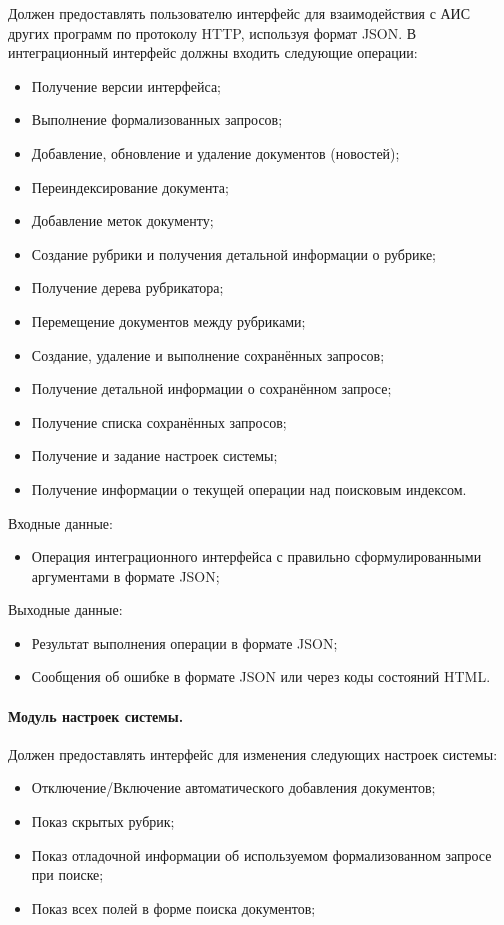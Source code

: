 Должен предоставлять пользователю интерфейс для взаимодействия с АИС других программ по протоколу HTTP, используя формат JSON. В интеграционный интерфейс должны входить следующие операции:
\begin{itemize}
\item Получение версии интерфейса;
\item Выполнение формализованных запросов;
\item Добавление, обновление и удаление документов (новостей);
\item Переиндексирование документа;
\item Добавление меток документу;
\item Создание рубрики и получения детальной информации о рубрике;
\item Получение дерева рубрикатора;
\item Перемещение документов между рубриками;
\item Создание, удаление и выполнение сохранённых запросов;
\item Получение детальной информации о сохранённом запросе;
\item Получение списка сохранённых запросов;
\item Получение и задание настроек системы;
\item Получение информации о текущей операции над поисковым индексом.
\end{itemize}

Входные данные:
\begin{itemize}
\item Операция интеграционного интерфейса с правильно сформулированными аргументами в формате JSON;
\end{itemize}

Выходные данные:
\begin{itemize}
\item Результат выполнения операции в формате JSON;
\item Сообщения об ошибке в формате JSON или через коды состояний HTML.
\end{itemize}

\paragraph{Модуль настроек системы.}
Должен предоставлять интерфейс для изменения следующих настроек системы:
\begin{itemize}
\item Отключение/Включение автоматического добавления документов;
\item Показ скрытых рубрик;
\item Показ отладочной информации об используемом формализованном запросе при поиске;
\item Показ всех полей в форме поиска документов;
\end{itemize}

